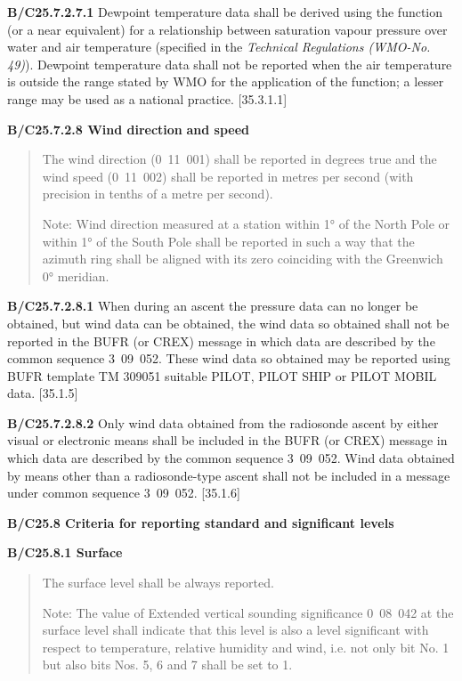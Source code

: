 \textbf{B/C25.7.2.7.1} Dewpoint temperature data shall be derived using the function (or a near equivalent) for a relationship between saturation vapour pressure over water and air temperature (specified in the \emph{Technical Regulations (WMO-No. 49)}). Dewpoint temperature data shall not be reported when the air temperature is outside the range stated by WMO for the application of the function; a lesser range may be used as a national practice. {[}35.3.1.1{]}

\textbf{B/C25.7.2.8 Wind direction} \textbf{and speed}

\begin{quote}
The wind direction (0~11~001) shall be reported in degrees true and the wind speed (0~11~002) shall be reported in metres per second (with precision in tenths of a metre per second).

Note: Wind direction measured at a station within 1° of the North Pole or within 1° of the South Pole shall be reported in such a way that the azimuth ring shall be aligned with its zero coinciding with the Greenwich 0° meridian.
\end{quote}

\textbf{B/C25.7.2.8.1} When during an ascent the pressure data can no longer be obtained, but wind data can be obtained, the wind data so obtained shall not be reported in the BUFR (or CREX) message in which data are described by the common sequence 3~09~052. These wind data so obtained may be reported using BUFR template TM 309051 suitable PILOT, PILOT SHIP or PILOT MOBIL data. {[}35.1.5{]}

\textbf{B/C25.7.2.8.2} Only wind data obtained from the radiosonde ascent by either visual or electronic means shall be included in the BUFR (or CREX) message in which data are described by the common sequence 3~09~052. Wind data obtained by means other than a radiosonde-type ascent shall not be included in a message under common sequence 3~09~052. {[}35.1.6{]}

\textbf{B/C25.8 Criteria for reporting standard and significant levels}

\textbf{B/C25.8.1 Surface}

\begin{quote}
The surface level shall be always reported.

Note: The value of Extended vertical sounding significance 0~08~042 at the surface level shall indicate that this level is also a level significant with respect to temperature, relative humidity and wind, i.e. not only bit No. 1 but also bits Nos. 5, 6 and 7 shall be set to 1.
\end{quote}

